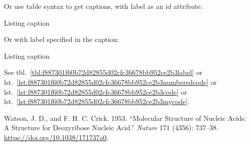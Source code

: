 Or use table syntax to get captions, with label as an id attribute:

\begin{codelisting}

\caption{Listing caption}

\hypertarget{lst:f887301f60b72d82855d02cfc36678bb952ce2b3mycode}{%
\label{lst:f887301f60b72d82855d02cfc36678bb952ce2b3mycode}}%
\begin{Shaded}
\begin{Highlighting}[]
 \NormalTok{ ()}
\OtherTok{=}  
\end{Highlighting}
\end{Shaded}

\end{codelisting}

Or with label specified in the caption:

\begin{codelisting}

\caption{Listing caption}

\hypertarget{lst:f887301f60b72d82855d02cfc36678bb952ce2b3code}{%
\label{lst:f887301f60b72d82855d02cfc36678bb952ce2b3code}}%
\begin{Shaded}
\begin{Highlighting}[]
 \NormalTok{ ()}
\OtherTok{=}  
\end{Highlighting}
\end{Shaded}

\end{codelisting}

See tbl.~\ref{tbl:f887301f60b72d82855d02cfc36678bb952ce2b3label} or
lst.~\ref{lst:f887301f60b72d82855d02cfc36678bb952ce2b3numberedcode} or
lst.~\ref{lst:f887301f60b72d82855d02cfc36678bb952ce2b3code} or
lst.~\ref{lst:f887301f60b72d82855d02cfc36678bb952ce2b3mycode}.

\hypertarget{refs}{}
\begin{CSLReferences}{1}{0}
\leavevmode{}%
Watson, J. D., and F. H. C. Crick. 1953. {``Molecular Structure of
Nucleic Acids: A Structure for Deoxyribose Nucleic Acid.''}
\emph{Nature} 171 (4356): 737--38.
\url{https://doi.org/10.1038/171737a0}.

\end{CSLReferences}
